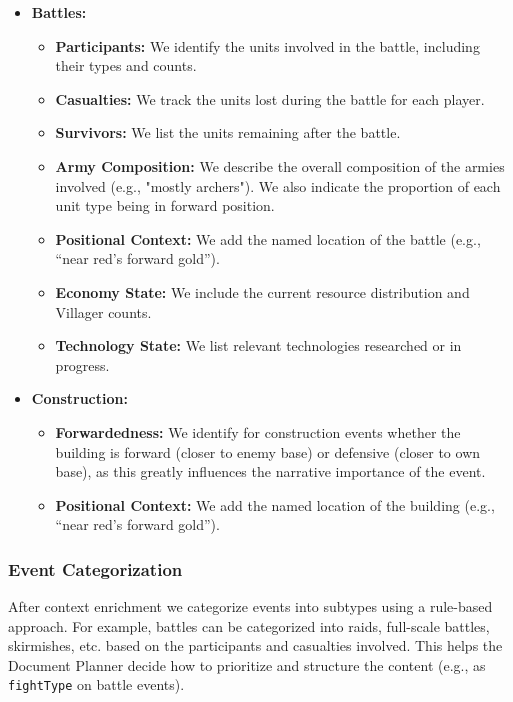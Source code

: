\begin{itemize}
  \item \textbf{Battles:}
    \begin{itemize}
      \item \textbf{Participants:} We identify the units involved in the battle, including their types and counts.
      \item \textbf{Casualties:} We track the units lost during the battle for each player.
      \item \textbf{Survivors:} We list the units remaining after the battle.
      \item \textbf{Army Composition:} We describe the overall composition of the armies involved (e.g., "mostly archers"). We also indicate the proportion of each unit type being in forward position.
      \item \textbf{Positional Context:} We add the named location of the battle (e.g., ``near red's forward gold'').
      \item \textbf{Economy State:} We include the current resource distribution and Villager counts.
      \item \textbf{Technology State:} We list relevant technologies researched or in progress.
    \end{itemize}
  \item \textbf{Construction:}
    \begin{itemize}
      \item \textbf{Forwardedness:} We identify for construction events whether the building is forward (closer to enemy base) or defensive (closer to own base), as this greatly influences the narrative importance of the event.
      \item \textbf{Positional Context:} We add the named location of the building (e.g., ``near red's forward gold'').
    \end{itemize}
\end{itemize}

\subsubsection{Event Categorization}
After context enrichment we categorize events into subtypes using a rule-based approach. For example, battles can be categorized into raids, full-scale battles, skirmishes, etc. based on the participants and casualties involved. This helps the Document Planner decide how to prioritize and structure the content (e.g., as \texttt{fightType} on battle events).

